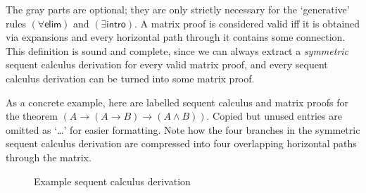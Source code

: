 \documentclass[twoside]{report}
\begin{document}
The gray parts are optional; they are only strictly necessary for the `generative' rules $(\forall\mathsf{elim})$ and $(\exists\mathsf{intro})$. A matrix proof is considered valid iff it is obtained via expansions and every horizontal path through it contains some connection. This definition is sound and complete, since we can always extract a \emph{symmetric} sequent calculus derivation for every valid matrix proof, and every sequent calculus derivation can be turned into some matrix proof.

As a concrete example, here are labelled sequent calculus and matrix proofs for the theorem $(A \to (A \to B) \to (A \land B))$. Copied but unused entries are omitted as `\ldots' for easier formatting. Note how the four branches in the symmetric sequent calculus derivation are compressed into four overlapping horizontal paths through the matrix.

\begin{figure}[ht]
    \centering
    \caption{Example sequent calculus derivation}
    \label{fig:example_sequent_calculus}
\end{figure}
\end{document}
